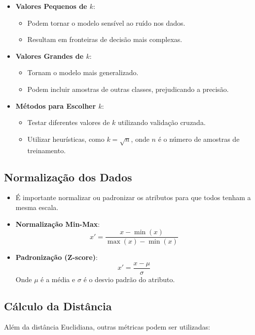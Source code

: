 \documentclass{sciposter}
\begin{document}
\begin{multicols}{3}
\begin{itemize}
    \item \textbf{Valores Pequenos de $k$}:
    \begin{itemize}
        \item Podem tornar o modelo sensível ao ruído nos dados.
        \item Resultam em fronteiras de decisão mais complexas.
    \end{itemize}
    \item \textbf{Valores Grandes de $k$}:
    \begin{itemize}
        \item Tornam o modelo mais generalizado.
        \item Podem incluir amostras de outras classes, prejudicando a precisão.
    \end{itemize}
    \item \textbf{Métodos para Escolher $k$}:
    \begin{itemize}
        \item Testar diferentes valores de $k$ utilizando validação cruzada.
        \item Utilizar heurísticas, como $k = \sqrt{n}$, onde $n$ é o número de amostras de treinamento.
    \end{itemize}
\end{itemize}

\subsection{Normalização dos Dados}

\begin{itemize}
    \item É importante normalizar ou padronizar os atributos para que todos tenham a mesma escala.
    \item \textbf{Normalização Min-Max}:
    \[
    x' = \frac{x - \min(x)}{\max(x) - \min(x)}
    \]
    \item \textbf{Padronização (Z-score)}:
    \[
    x' = \frac{x - \mu}{\sigma}
    \]
    Onde $\mu$ é a média e $\sigma$ é o desvio padrão do atributo.
\end{itemize}

\subsection{Cálculo da Distância}

Além da distância Euclidiana, outras métricas podem ser utilizadas:


\end{multicols}
\end{document}
